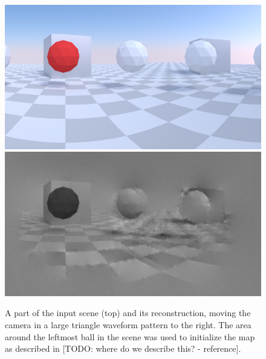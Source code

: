 \begin{figure}
\includegraphics[width=\columnwidth]{images/zigzag_input.png}
\includegraphics[width=\columnwidth]{images/zigzag_reconstruction.png}
\caption{A part of the input scene (top) and its reconstruction,
moving the camera in a large triangle waveform pattern to the right.
The area around the leftmost ball in the scene was used to initialize
the map as described in [TODO: where do we describe this? - reference].}
\label{fig:zigzag_reconstruction}
\end{figure}
